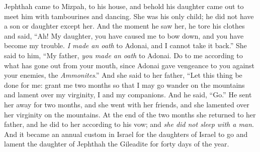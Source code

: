 \begin{biblechapter}
\verse Jephthah came to Mizpah, to his house, and behold his daughter came out to meet him with tambourines and dancing. She was his only child; he did not have a son or daughter except her.
\verse And the moment he saw her, he tore his clothes and said, “Ah! My daughter, you have caused me to bow down, and you have become my trouble. \textit{I made an oath} to Adonai, and I cannot take it back.”
\verse She said to him, “My father, \textit{you made an oath} to Adonai. Do to me according to what has gone out from your mouth, since Adonai gave vengeance to you against your enemies, the \textit{Ammonites}.”
\verse And she said to her father, “Let this thing be done for me: grant me two months so that I may go wander on the mountains and lament over my virginity, I and my companions.
\verse And he said, “Go.” He sent her away for two months, and she went with her friends, and she lamented over her virginity on the mountains.
\verse At the end of the two months she returned to her father, and he did to her according to his vow; and \textit{she did not sleep with a man}. And it became an annual custom in Israel
\verse for the daughters of Israel to go and lament the daughter of Jephthah the Gileadite for forty days of the year.
\end{biblechapter}

